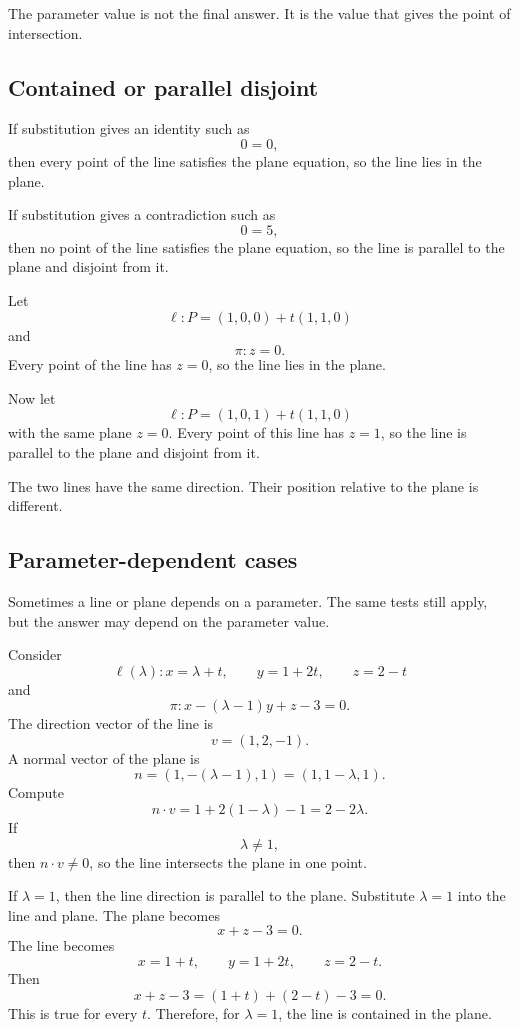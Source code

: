 The parameter value is not the final answer. It is the value that gives the point of intersection.

\subsection*{Contained or parallel disjoint}

If substitution gives an identity such as
\[
0=0,
\]
then every point of the line satisfies the plane equation, so the line lies in the plane.

If substitution gives a contradiction such as
\[
0=5,
\]
then no point of the line satisfies the plane equation, so the line is parallel to the plane and disjoint from it.

\begin{examplebox}
Let
\[
\ell:P=(1,0,0)+t(1,1,0)
\]
and
\[
\pi:z=0.
\]
Every point of the line has \(z=0\), so the line lies in the plane.

Now let
\[
\ell:P=(1,0,1)+t(1,1,0)
\]
with the same plane \(z=0\). Every point of this line has \(z=1\), so the line is parallel to the plane and disjoint from it.
\end{examplebox}

The two lines have the same direction. Their position relative to the plane is different.

\subsection*{Parameter-dependent cases}

Sometimes a line or plane depends on a parameter. The same tests still apply, but the answer may depend on the parameter value.

\begin{examplebox}
Consider
\[
\ell(\lambda):x=\lambda+t,\qquad y=1+2t,\qquad z=2-t
\]
and
\[
\pi:x-(\lambda-1)y+z-3=0.
\]
The direction vector of the line is
\[
v=(1,2,-1).
\]
A normal vector of the plane is
\[
n=(1,-(\lambda-1),1)=(1,1-\lambda,1).
\]
Compute
\[
n\cdot v=1+2(1-\lambda)-1=2-2\lambda.
\]
If
\[
\lambda\ne1,
\]
then \(n\cdot v\ne0\), so the line intersects the plane in one point.

If \(\lambda=1\), then the line direction is parallel to the plane. Substitute \(\lambda=1\) into the line and plane. The plane becomes
\[
x+z-3=0.
\]
The line becomes
\[
x=1+t,\qquad y=1+2t,\qquad z=2-t.
\]
Then
\[
x+z-3=(1+t)+(2-t)-3=0.
\]
This is true for every \(t\). Therefore, for \(\lambda=1\), the line is contained in the plane.
\end{examplebox}

